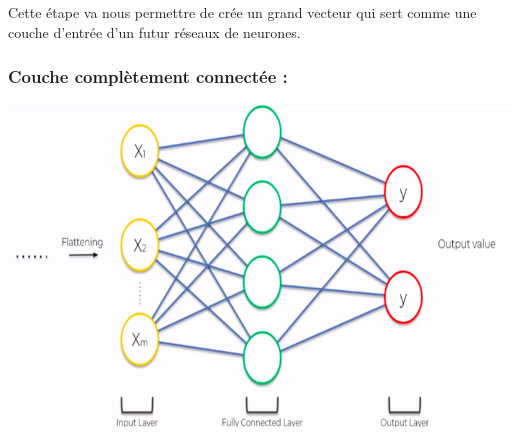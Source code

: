 Cette étape va nous permettre de crée un grand vecteur qui sert comme une couche d’entrée d’un futur réseaux de neurones.

\subsubsection{Couche complètement connectée : }

\begin{center}
	\includegraphics[scale=0.3]{img17.png}
\end{center}

